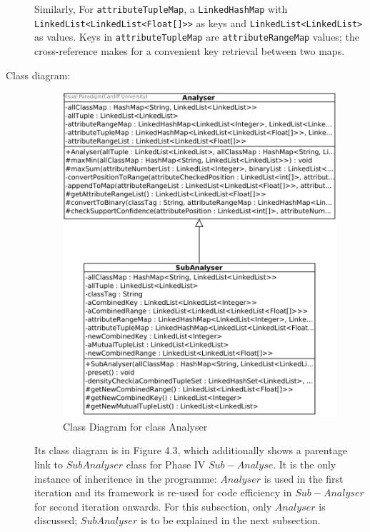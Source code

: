 \begin{description}
Similarly, For \texttt{attributeTupleMap}, a \texttt{LinkedHashMap} with \texttt{LinkedList<LinkedList<Float[]>>} as keys and \texttt{LinkedList<LinkedList>} as values. Keys in \texttt{attributeTupleMap} are \texttt{attributeRangeMap} values; the cross-reference makes for a convenient key retrieval between two maps. 

\item[Class diagram: ] 

\begin{figure}[h]
    \centering
    \includegraphics[width=5in]{figures/class_analyser}
    \caption[Class Diagram for class Analyser]{Class Diagram for class Analyser}
    \label{fig:figure4_3}
\end{figure}

Its class diagram is in Figure 4.3, which additionally shows a parentage link to $SubAnalyser$ class for Phase IV $Sub-Analyse$. It is the only instance of inheritence in the programme: $Analyser$ is used in the first iteration and its framework is re-used for code efficiency in $Sub-Analyser$ for second iteration onwards. For this subsection, only $Analyser$ is discussed; $SubAnalyser$ is to be explained in the next subsection.


\end{description}
